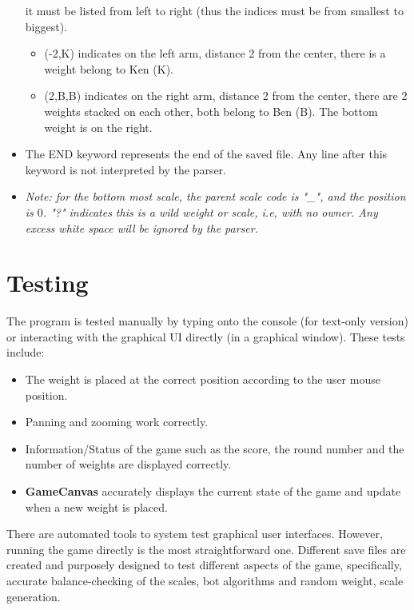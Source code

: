 \documentclass[12pt]{article}
\begin{document}
\begin{itemize}
    it must be listed from left to right (thus the indices must be from smallest
    to biggest). 
    \begin{itemize}
      \item (-2,K) indicates on the left arm, distance 2 from the center, there
        is a weight belong to Ken (K).
      \item (2,B,B) indicates on the right arm, distance 2 from the center,
        there are 2 weights stacked on each other, both belong to Ben (B). The
        bottom weight is on the right.
    \end{itemize}
  \item The END keyword represents the end of the saved file. Any line after
    this keyword is not interpreted by the parser.
  \item \textit{Note: for the bottom most scale, the parent scale code is "\_",
    and the position is $0$. "?" indicates this is a wild weight or scale, i.e,
  with no owner. Any excess white space will be ignored by the parser.} 
\end{itemize}

\section{Testing}

The program is tested manually by typing onto the console (for text-only
version) or interacting with the graphical UI directly (in a graphical window).
These tests include:
\begin{itemize}
  \item The weight is placed at the correct position according to the user mouse
    position.
  \item Panning and zooming work correctly.
  \item Information/Status of the game such as the score, the round number and
    the number of weights are displayed correctly.
  \item \textbf{GameCanvas} accurately displays the current state of the game
    and update when a new weight is placed.
\end{itemize}

There are automated tools to system test graphical user interfaces. However,
running the game directly is the most straightforward one. Different save files
are created and purposely designed to test different aspects of the game,
specifically, accurate balance-checking of the scales, bot algorithms and random
weight, scale generation. 
\end{document}
